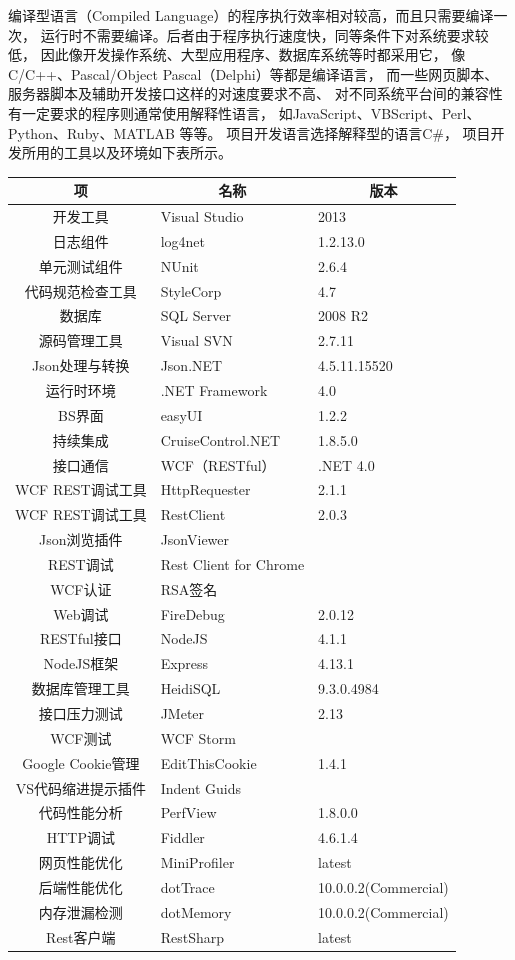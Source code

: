 \documentclass{book}
\begin{document}
编译型语言（Compiled Language）的程序执行效率相对较高，而且只需要编译一次，
运行时不需要编译。后者由于程序执行速度快，同等条件下对系统要求较低，
因此像开发操作系统、大型应用程序、数据库系统等时都采用它，
像C/C++、Pascal/Object Pascal（Delphi）等都是编译语言，
而一些网页脚本、服务器脚本及辅助开发接口这样的对速度要求不高、
对不同系统平台间的兼容性有一定要求的程序则通常使用解释性语言，
如JavaScript、VBScript、Perl、Python、Ruby、MATLAB 等等。
项目开发语言选择解释型的语言C\#，
项目开发所用的工具以及环境如下表所示。

\begin{tabular}{c|l|l}
	\multirow{1}{*}{项}			
	& \multicolumn{1}{c}{名称}
	& \multicolumn{1}{|c}{版本}\\
	\hline
	开发工具 & Visual Studio & 2013\\
	日志组件 & log4net & 1.2.13.0\\	
	单元测试组件 & NUnit & 2.6.4\\
	代码规范检查工具 & StyleCorp & 4.7\\	
	数据库 & SQL Server & 2008 R2\\
	源码管理工具 & Visual SVN & 2.7.11\\
	Json处理与转换 & Json.NET & 4.5.11.15520\\
	运行时环境 & .NET Framework & 4.0\\
	BS界面 & easyUI & 1.2.2\\
	持续集成 & CruiseControl.NET & 1.8.5.0\\
	接口通信 & WCF（RESTful） & .NET 4.0\\
	WCF REST调试工具 & HttpRequester & 2.1.1 \\
	WCF REST调试工具 & RestClient & 2.0.3 \\
	Json浏览插件 & JsonViewer & \\
	REST调试 & Rest Client for Chrome & \\
	WCF认证 & RSA签名 & \\
	Web调试 & FireDebug & 2.0.12\\
	RESTful接口 & NodeJS & 4.1.1\\
	NodeJS框架 & Express & 4.13.1\\
	数据库管理工具 & HeidiSQL & 9.3.0.4984\\
	接口压力测试 & JMeter & 2.13\\
	WCF测试 & WCF Storm & \\
	Google Cookie管理 & EditThisCookie & 1.4.1 \\
	VS代码缩进提示插件 & Indent Guids & \\
	代码性能分析 & PerfView & 1.8.0.0  \\ 
	HTTP调试 &  Fiddler & 4.6.1.4\\		
    网页性能优化 & MiniProfiler & latest\\
    后端性能优化 & dotTrace & 10.0.0.2(Commercial)\\
    内存泄漏检测 & dotMemory & 10.0.0.2(Commercial)\\
    Rest客户端 & RestSharp & latest\\		
    \end{tabular}
\end{document}
